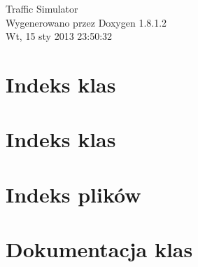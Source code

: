 \documentclass{book}
\begin{document}
\hypersetup{pageanchor=false,citecolor=blue}
\begin{titlepage}
\vspace*{7cm}
\begin{center}
{\Large Traffic Simulator }\\
\vspace*{1cm}
{\large Wygenerowano przez Doxygen 1.8.1.2}\\
\vspace*{0.5cm}
{\small Wt, 15 sty 2013 23:50:32}\\
\end{center}
\end{titlepage}
\clearemptydoublepage
{}
\tableofcontents
\clearemptydoublepage
{}
\hypersetup{pageanchor=true,citecolor=blue}
\chapter{Indeks klas}

\chapter{Indeks klas}

\chapter{Indeks plików}

\chapter{Dokumentacja klas}




























\end{document}
